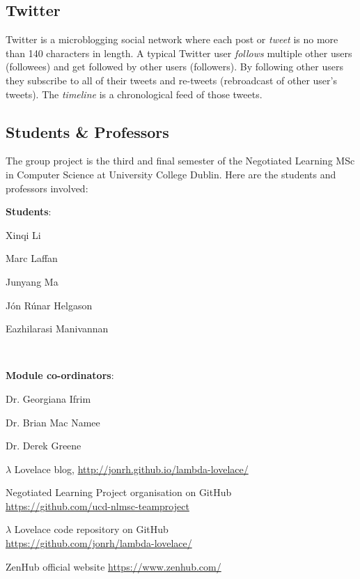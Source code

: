 \documentclass{article}
\begin{document}
\subsection{Twitter}
Twitter is a microblogging social network where each post or \textit{tweet} is no more than 140 characters in length. A typical Twitter user \textit{follows} multiple other users (followees) and get followed by other users (followers). By following other users they subscribe to all of their tweets and re-tweets (rebroadcast of other user's tweets). The \textit{timeline} is a chronological feed of those tweets.

\subsection{Students \& Professors}
The group project is the third and final semester of the Negotiated Learning MSc in Computer Science at University College Dublin. Here are the students and professors involved:

\begin{samepage}
\begin{center}
\begin{minipage}[t]{.4\textwidth}
	\textbf{Students}:
		\begin{itemize*}
			\item Xinqi Li
			\item Marc Laffan
			\item Junyang Ma
			\item Jón Rúnar Helgason
			\item Eazhilarasi Manivannan
		\end{itemize*}
\end{minipage}
~
\begin{minipage}[t]{.4\textwidth}
	\textbf{Module co-ordinators}:
	\begin{itemize*}
		\item Dr. Georgiana Ifrim
		\item Dr. Brian Mac Namee
		\item Dr. Derek Greene
	\end{itemize*}
\end{minipage}
\end{center}
\end{samepage}

\vspace{0.5em}

\begin{thebibliography}{9} 

	$\lambda$ Lovelace blog, \url{http://jonrh.github.io/lambda-lovelace/}
	
	Negotiated Learning Project organisation on GitHub \\
	\url{https://github.com/ucd-nlmsc-teamproject}

	$\lambda$ Lovelace code repository on GitHub \\
	\url{https://github.com/jonrh/lambda-lovelace/}
	
	ZenHub official website \url{https://www.zenhub.com/}


\end{thebibliography}
\end{document}
